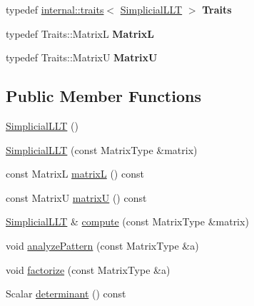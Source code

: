 \begin{DoxyCompactItemize}
\item 
\mbox{\label{class_eigen_1_1_simplicial_l_l_t_ae947a7ed7abfda636d0832d12d874bdb}} 
typedef \mbox{\hyperlink{struct_eigen_1_1internal_1_1traits}{internal\+::traits}}$<$ \mbox{\hyperlink{class_eigen_1_1_simplicial_l_l_t}{Simplicial\+L\+LT}} $>$ {\bfseries Traits}
\item 
\mbox{\label{class_eigen_1_1_simplicial_l_l_t_a17d6da2a481c7eb265499e3c5f96cc7c}} 
typedef Traits\+::\+MatrixL {\bfseries MatrixL}
\item 
\mbox{\label{class_eigen_1_1_simplicial_l_l_t_abd9cf7233a689d90e574d3f1c96f3fac}} 
typedef Traits\+::\+MatrixU {\bfseries MatrixU}
\end{DoxyCompactItemize}
\subsection*{Public Member Functions}
\begin{DoxyCompactItemize}
\item 
\mbox{\hyperlink{class_eigen_1_1_simplicial_l_l_t_ad25633e34d7c21b77fe05c873ffbe416}{Simplicial\+L\+LT}} ()
\item 
\mbox{\hyperlink{class_eigen_1_1_simplicial_l_l_t_a342735f17d0306aa5581e91010091427}{Simplicial\+L\+LT}} (const Matrix\+Type \&matrix)
\item 
const MatrixL \mbox{\hyperlink{class_eigen_1_1_simplicial_l_l_t_ae2b24f8f6d62a8444193904988374299}{matrixL}} () const
\item 
const MatrixU \mbox{\hyperlink{class_eigen_1_1_simplicial_l_l_t_a23522d6444c344ddb14e48dbfac128ed}{matrixU}} () const
\item 
\mbox{\hyperlink{class_eigen_1_1_simplicial_l_l_t}{Simplicial\+L\+LT}} \& \mbox{\hyperlink{class_eigen_1_1_simplicial_l_l_t_a24ffa253377a1cec7a44b856fae1f71a}{compute}} (const Matrix\+Type \&matrix)
\item 
void \mbox{\hyperlink{class_eigen_1_1_simplicial_l_l_t_ad6e49b1c0d2ec5c8e118538260f3002c}{analyze\+Pattern}} (const Matrix\+Type \&a)
\item 
void \mbox{\hyperlink{class_eigen_1_1_simplicial_l_l_t_a8a140b34b08df74c7426ee29b986b228}{factorize}} (const Matrix\+Type \&a)
\item 
Scalar \mbox{\hyperlink{class_eigen_1_1_simplicial_l_l_t_a956595848e6fac7a389d091b3fdc9567}{determinant}} () const
\end{DoxyCompactItemize}
